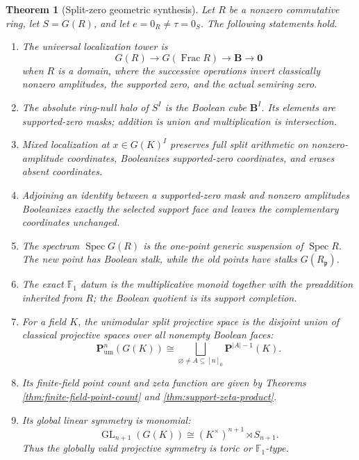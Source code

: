 \documentclass[11pt]{amsart}
\numberwithin{equation}{section}
\newtheorem{theorem}{Theorem}[section]
\theoremstyle{definition}
\newcommand{\B}{\mathbf B}
\newcommand{\Spec}{\operatorname{Spec}}
\newcommand{\GL}{\operatorname{GL}}
\newcommand{\Frac}{\operatorname{Frac}}
\newcommand{\zero}{\mathbf 0}
\newcommand{\Pum}{\mathbf P_{\mathrm{um}}}
\begin{document}
\begin{theorem}[Split-zero geometric synthesis]\label{thm:final-synthesis}
Let $R$ be a nonzero commutative ring, let $S=G(R)$, and let $e=0_R\neq\tau=0_S$.  The following statements hold.
\begin{enumerate}[label=\textup{(\arabic*)},leftmargin=3.2em]
\item The universal localization tower is
\[
G(R)
\longrightarrow
G(\Frac R)
\longrightarrow
\B
\longrightarrow
\zero
\]
when $R$ is a domain, where the successive operations invert classically nonzero amplitudes, the supported zero, and the actual semiring zero.

\item The absolute ring-null halo of $S^I$ is the Boolean cube $\B^I$.  Its elements are supported-zero masks; addition is union and multiplication is intersection.

\item Mixed localization at $x\in G(K)^I$ preserves full split arithmetic on nonzero-amplitude coordinates, Booleanizes supported-zero coordinates, and erases absent coordinates.

\item Adjoining an identity between a supported-zero mask and nonzero amplitudes Booleanizes exactly the selected support face and leaves the complementary coordinates unchanged.

\item The spectrum $\Spec G(R)$ is the one-point generic suspension of $\Spec R$.  The new point has Boolean stalk, while the old points have stalks $G(R_{\mathfrak p})$.

\item The exact $\mathbb F_1$ datum is the multiplicative monoid together with the preaddition inherited from $R$; the Boolean quotient is its support completion.

\item For a field $K$, the unimodular split projective space is the disjoint union of classical projective spaces over all nonempty Boolean faces:
\[
\Pum^n(G(K))
\cong
\bigsqcup_{\varnothing\neq A\subseteq[n]_0}
\mathbf P^{|A|-1}(K).
\]

\item Its finite-field point count and zeta function are given by Theorems \ref{thm:finite-field-point-count} and \ref{thm:support-zeta-product}.

\item Its global linear symmetry is monomial:
\[
\GL_{n+1}(G(K))
\cong
(K^\times)^{n+1}\rtimes S_{n+1}.
\]
Thus the globally valid projective symmetry is toric or $\mathbb F_1$-type.


\end{enumerate}
\end{theorem}
\end{document}
